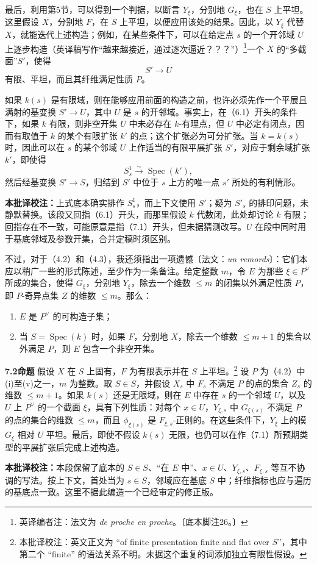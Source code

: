 \documentclass{ctexbook}
\newcommand{\Spec}{\operatorname{Spec}}
\newcommand{\ednote}[1]{\footnote{英译编者注：#1}}
\newcommand{\tnote}[1]{\par\smallskip\noindent\textbf{本批译校注：}#1\par\smallskip}
\newcommand{\entry}[2]{\par\bigskip\noindent\textbf{#1\quad #2}\quad}
\begin{document}
最后，利用第5节，可以得到一个判据，以断言 $Y_\xi$，分别地 $G_\xi$，也在 $S$ 上平坦。这里假设 $X$，分别地 $F$，在 $S$ 上平坦，以便应用该处的结果。因此，以 $Y_\xi$ 代替 $X$，就能迭代上述构造；例如，在某些条件下，可以在给定点 $s$ 的一个开邻域 $U$ 上逐步构造（英译稿写作“越来越接近，通过逐次逼近？？？”）\ednote{法文为 \textit{de proche en proche}。〔底本脚注26。〕}一个 $X$ 的“多截面”$S'$，使得
\[
 S'\longrightarrow U
\]
有限、平坦，而且其纤维满足性质 $P$。

如果 $k(s)$ 是有限域，则在能够应用前面的构造之前，也许必须先作一个平展且满射的基变换 $S'\to U$，其中 $U$ 是 $s$ 的开邻域。事实上，在（6.1）开头的条件下，如果 $k$ 有限，则非空开集 $U$ 中未必存在 $k$-有理点，但 $U$ 中必定有闭点，因而有取值于 $k$ 的某个有限扩张 $k'$ 的点；这个扩张必为可分扩张。当 $k=k(s)$ 时，因此可以在 $s$ 的某个邻域 $U$ 上作适当的有限平展扩张 $S'$，对应于剩余域扩张 $k'$，即使得
\[
 S_s^1\xrightarrow{\sim}\Spec(k'),
\]
然后经基变换 $S'\to S$，归结到 $S'$ 中位于 $s$ 上方的唯一点 $s'$ 所处的有利情形。
\tnote{上式底本确实排作 $S_s^1$，而上下文使用 $S'$；疑为 $S'_s$ 的排印问题，未静默替换。该段又回指（6.1）开头，而那里假设 $k$ 代数闭，此处却讨论 $k$ 有限；回指存在不一致，可能原意是指（7.1）开头，但未据猜测改写。$U$ 在段中同时用于基底邻域及参数开集，合并定稿时须区别。}

不过，对于（4.2）和（4.3），我还须指出一项遗憾〔法文：\textit{un remords}〕：它们本应以稍广一些的形式陈述，至少作为一条备注。给定整数 $m$，令 $E$ 为那些 $\xi\in P^\vee$ 所成的集合，使得 $G_\xi$，分别地 $Y_\xi$，除去一个维数 $\leq m$ 的闭集以外满足性质 $P$，即 $P$-奇异点集 $Z$ 的维数 $\leq m$。那么：
\begin{enumerate}
\item[(a)] $E$ 是 $P^\vee$ 的可构造子集；
\item[(b)] 当 $S=\Spec(k)$ 时，如果 $F$，分别地 $X$，除去一个维数 $\leq m+1$ 的集合以外满足 $P$，则 $E$ 包含一个非空开集。
\end{enumerate}

\entry{7.2}{命题}
假设 $X$ 在 $S$ 上固有，$F$ 为有限表示并在 $S$ 上平坦。\footnote{本批译校注：英文正文为 ``of finite presentation finite and flat over $S$''，其中第二个 ``finite'' 的语法关系不明。未据这个重复的词添加独立有限性假设。}
设 $P$ 为（4.2）中(i)至(v)之一，$m$ 为整数。取 $S\in S$，并假设 $X_s$ 中 $F_s$ 不满足 $P$ 的点的集合 $Z_s$ 的维数 $\leq m+1$。如果 $k(s)$ 还是无限域，则在 $E$ 中存在 $s$ 的一个邻域 $U$，以及 $U$ 上 $P^\vee$ 的一个截面 $\xi$，具有下列性质：对每个 $x\in U$，$Y_{\xi,s}$ 中 $G_{\xi(s)}$ 不满足 $P$ 的点的集合的维数 $\leq m$，而且 $\phi_{\xi(s)}$ 是 $F_{\xi,s}$-正则的。在这些条件下，$Y_\xi$ 上的模 $G_\xi$ 相对 $U$ 平坦。最后，即使不假设 $k(s)$ 无限，也仍可以在作（7.1）所预期类型的平展扩张后完成上述构造。
\tnote{本段保留了底本的 $S\in S$、``在 $E$ 中''、$x\in U$、$Y_{\xi,s}$、$F_{\xi,s}$ 等互不协调的写法。按上下文，首处当为 $s\in S$，邻域应在基底 $S$ 中；纤维指标也应与遍历的基底点一致。这里不据此编造一个已经审定的修正版。}
\end{document}
